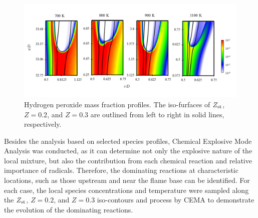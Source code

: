 \documentclass[review,3p,times]{elsarticleUS}
\begin{document}
\begin{figure}[t]
  \centering
  \scriptsize
  \vspace{-0.1in}
  \includegraphics[width=1.0\textwidth]{H2O2.png}
  \normalsize
  \vspace{-0.1in}
  \caption{Hydrogen peroxide mass fraction profiles.  The iso-furfaces of $Z_{\rm st}$, $Z = 0.2$, and $Z = 0.3$ are outlined from left to right in solid lines, respectively.}
  \label{fig:H2O2}
\end{figure}

Besides the analysis based on selected species profiles, Chemical Explosive Mode Analysis was conducted, as it can determine not only the explosive nature of the local mixture, but also the contribution from each chemical reaction and relative importance of radicals.  Therefore, the dominating reactions at characteristic locations, such as those upstream and near the flame base can be identified.  For each case, the local species concentrations and temperature were sampled along the $Z_{\rm st}$, $Z = 0.2$, and $Z = 0.3$ iso-contours and process by CEMA to demonstrate the evolution of the dominating reactions.
\end{document}
